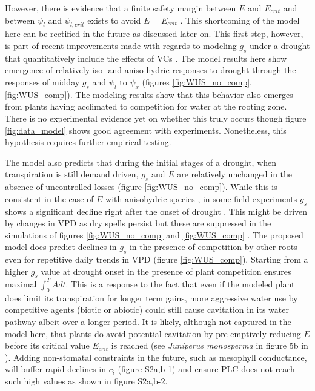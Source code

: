 \documentclass[utf8]{frontiersSCNS} %
\begin{document}
However, there is evidence that a finite safety margin between $E$ and $E_{crit}$ and between $\psi_l$ and $\psi_{l, crit}$ exists to avoid $E = E_{crit}$ \citep{mcdowell_mechanisms_2008, plaut_hydraulic_2012}. This shortcoming of the model here can be rectified in the future as discussed later on. This first step, however, is part of recent improvements made with regards to modeling $g_s$ under a drought that quantitatively include the effects of VCs \citep{sperry_what_2015, sperry_predicting_2017}. The model results here show emergence of relatively iso- and aniso-hydric responses to drought through the responses of midday $g_s$ and $\psi_l$ to $\psi_x$ (figures \ref{fig:WUS_no_comp}, \ref{fig:WUS_comp}). The modeling results show that this behavior also emerges from plants having acclimated to competition for water at the rooting zone. There is no experimental evidence yet on whether this truly occurs though figure \ref{fig:data_model} shows good agreement with experiments. Nonetheless, this hypothesis requires further empirical testing.

The model also predicts that during the initial stages of a drought, when transpiration is still demand driven, $g_s$ and $E$ are relatively unchanged in the absence of uncontrolled losses (figure \ref{fig:WUS_no_comp}). While this is consistent in the case of $E$ with anisohydric species \citep{hochberg_iso/anisohydry:_2018}, in some field experiments $g_s$ shows a significant decline right after the onset of drought \citep{gollan_1985, schulze_1986}. This might be driven by changes in VPD as dry spells persist but these are suppressed in the simulations of figures \ref{fig:WUS_no_comp} and \ref{fig:WUS_comp} . The proposed model does predict declines in $g_s$ in the presence of competition by other roots even for repetitive daily trends in VPD (figure \ref{fig:WUS_comp}). Starting from a higher $g_s$ value at drought onset in the presence of plant competition ensures maximal $\int_0^T A dt$. This is a response to the fact that even if the modeled plant does limit its transpiration for longer term gains, more aggressive water use by competitive agents (biotic or abiotic) could still cause cavitation in its water pathway albeit over a longer period. It is likely, although not captured in the model here, that plants do avoid potential cavitation by pre-emptively reducing $E$ before its critical value $E_{crit}$ is reached (see \textit{Juniperus monosperma} in figure 5b in \citet{garciaforner_responses_2016}). Adding non-stomatal constraints in the future, such as mesophyll conductance, will buffer rapid declines in $c_i$ (figure S2a,b-1) and ensure PLC does not reach such high values as shown in figure S2a,b-2.
\end{document}
